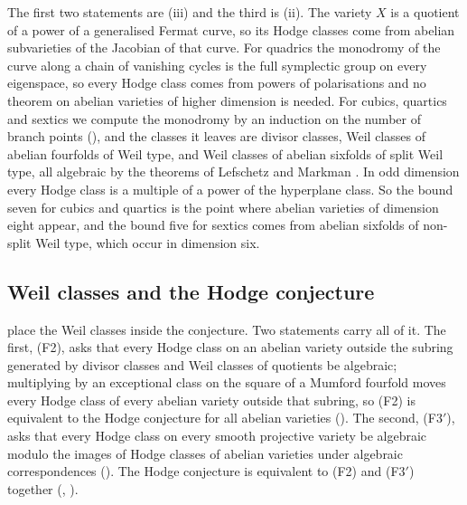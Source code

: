 The first two statements are (iii) and the third is
(ii). The variety $X$ is a quotient of a power of a
generalised Fermat curve, so its Hodge classes come from abelian subvarieties
of the Jacobian of that curve. For quadrics the monodromy of the curve along
a chain of vanishing cycles is the full symplectic group on every eigenspace,
so every Hodge class comes from powers of polarisations and no theorem on
abelian varieties of higher dimension is needed. For cubics, quartics and
sextics we compute the monodromy by an induction on the number of branch
points (), and the classes it leaves are divisor
classes, Weil classes of abelian fourfolds of Weil type, and Weil classes of
abelian sixfolds of split Weil type, all algebraic by the theorems of
Lefschetz and Markman \cite{Mar25a,Mar25b}. In odd dimension every Hodge
class is a multiple of a power of the hyperplane class. So the bound seven
for cubics and quartics is the point where abelian varieties of dimension
eight appear, and the bound five for sextics comes from abelian sixfolds of
non-split Weil type, which occur in dimension six.



\subsection{Weil classes and the Hodge conjecture}

 place the Weil classes inside the
conjecture. Two
statements carry all of it. The first, (F2), asks that every Hodge class on an
abelian variety outside the subring generated by divisor classes and Weil
classes of quotients be algebraic; multiplying by an exceptional class on the
square of a Mumford fourfold moves every Hodge class of every abelian variety
outside that subring, so (F2) is equivalent to the Hodge conjecture for all
abelian varieties (). The second, (F3$'$), asks that every
Hodge class on every smooth projective variety be algebraic modulo the images
of Hodge classes of abelian varieties under algebraic correspondences
(). The Hodge conjecture is equivalent to (F2) and (F3$'$)
together (, ).

